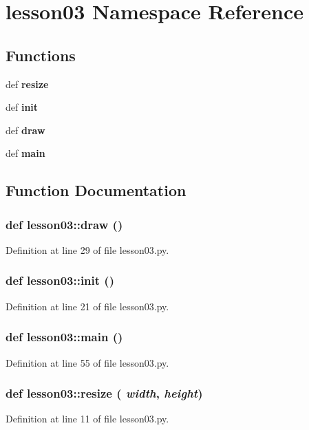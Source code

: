 \section{lesson03 Namespace Reference}
\label{namespacelesson03}


\subsection*{Functions}
\begin{CompactItemize}
\item 
def {\bf resize}
\item 
def {\bf init}
\item 
def {\bf draw}
\item 
def {\bf main}
\end{CompactItemize}


\subsection{Function Documentation}
\subsubsection{\setlength{\rightskip}{0pt plus 5cm}def lesson03::draw ()}\label{namespacelesson03_722189e93282dc070cd6709d2c47638f}




Definition at line 29 of file lesson03.py.
\subsubsection{\setlength{\rightskip}{0pt plus 5cm}def lesson03::init ()}\label{namespacelesson03_c640deefcb3f2cb39d39ccfce80ba56d}




Definition at line 21 of file lesson03.py.
\subsubsection{\setlength{\rightskip}{0pt plus 5cm}def lesson03::main ()}\label{namespacelesson03_4b8ccf49179ae52bc1216cd224bddeb9}




Definition at line 55 of file lesson03.py.
\subsubsection{\setlength{\rightskip}{0pt plus 5cm}def lesson03::resize ( {\em width},  {\em height})}\label{namespacelesson03_7f6423b39109c50250f0de7576b5dbda}




Definition at line 11 of file lesson03.py.